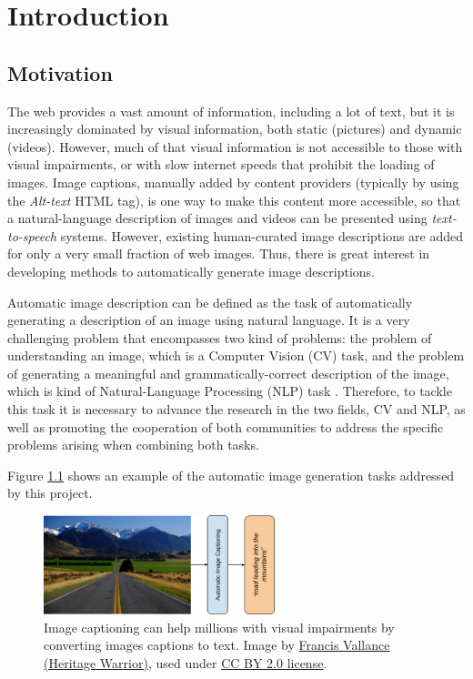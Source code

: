 \chapter{Introduction}
\label{chapter:introduccion}

\section{Motivation}

The web provides a vast amount of information, including a lot of text, but it is increasingly dominated by visual information, both static (pictures) and dynamic (videos).  However, much of that visual information is not accessible to those with visual impairments, or with slow internet speeds that prohibit the loading of images. Image captions, manually added by content providers (typically by using the \textit{ Alt-text} HTML tag), is one way to make this content more accessible, so that a natural-language description of images and videos can be presented using \textit{text-to-speech} systems. However, existing human-curated image descriptions are added for only a very small fraction of web images. Thus, there is great interest in developing methods to automatically generate image descriptions.

Automatic image description can be defined as the task of automatically generating a description of an image using natural language. It is a very challenging problem that encompasses two kind of problems: the problem of understanding an image, which is a Computer Vision (CV) task, and the problem of generating a meaningful and grammatically-correct description of the image, which is kind of Natural-Language Processing (NLP) task . Therefore, to tackle this task it is necessary to advance the research in the two fields, CV and NLP, as well as promoting the cooperation of both communities to address the specific problems arising when combining both tasks.

Figure \ref{fig:image-captioning} shows an example of the automatic image generation tasks addressed by this project.

\begin{figure}
	\centering
	\includegraphics[width=0.6\textwidth]{figs/ch1/image-captioning.png}
	\caption{Image captioning can help millions with visual impairments by converting images captions to text. Image by \href{https://www.flickr.com/photos/francisvallance/}{Francis Vallance (Heritage Warrior)}, used under \href{https://creativecommons.org/licenses/by/2.0/}{CC BY 2.0 license}.}
	\label{fig:image-captioning}
\end{figure}


